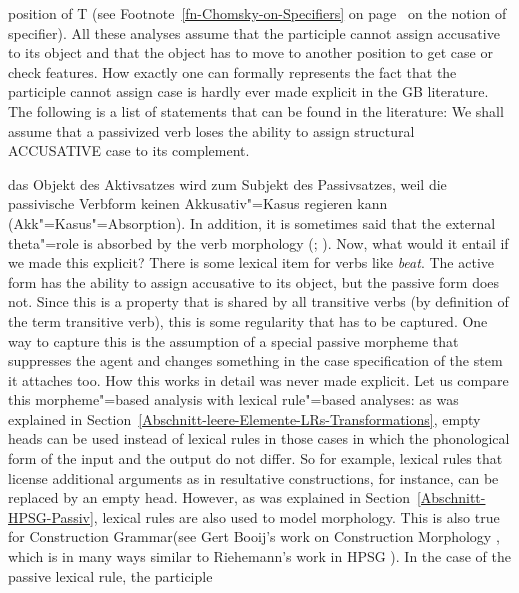 position of T (see Footnote~\ref{fn-Chomsky-on-Specifiers} on
page~\pageref{fn-Chomsky-on-Specifiers} on the notion of specifier). All these analyses assume that
the participle cannot assign accusative to its object and that the object has to move to another
position to get case or check features.
How exactly one can formally represents the fact that the participle cannot assign case is hardly ever made explicit in the GB literature.
The following is a list of statements that can be found in the literature:
\eal
\ex We shall assume that a passivized verb loses the ability to assign structural ACCUSATIVE case to
its complement. \citep[]{Haegeman94a-u}

\ex das Objekt des Aktivsatzes wird zum Subjekt des Passivsatzes, weil die passivische Verbform
keinen Akkusativ"=Kasus regieren kann (Akk"=Kasus"=Absorption). \citep[]{Lohnstein2014a} 
\zl
In addition, it is sometimes said that the external theta"=role is absorbed by the verb morphology
(\citealp{Jaeggli86a}; 
\citealp[]{Haegeman94a-u}). Now, what would it entail if we made this explicit? There is some
lexical item for verbs like \emph{beat}. The active form has the ability to assign accusative to its
object, but the passive form does not. Since this is a property that is shared by all transitive
verbs (by definition of the term transitive verb), this is some regularity that has to be
captured. One way to capture this is the assumption of a special passive morpheme that suppresses
the agent and changes something in the case specification of the stem it attaches too. How this
works in detail was never made explicit.
Let us compare this morpheme"=based analysis with lexical rule"=based analyses: as was explained in
Section~\ref{Abschnitt-leere-Elemente-LRs-Transformations}, empty heads can be used instead of
lexical rules in those cases in which the phonological form of the input and the output do not
differ. So for example, lexical rules that license additional arguments as in
resultative constructions, for instance, can be replaced by an empty head. However, as was explained in Section~\ref{Abschnitt-HPSG-Passiv}, lexical 
rules are also used to model morphology. This is also true for Construction Grammar\indexcxg (see
Gert Booij's work on Construction Morphology \citeyearpar{Booij2010a}, which is in many ways similar to Riehemann's work in
HPSG \citeyearpar{Riehemann93a,Riehemann98a}). In the case of the passive lexical rule, the participle
